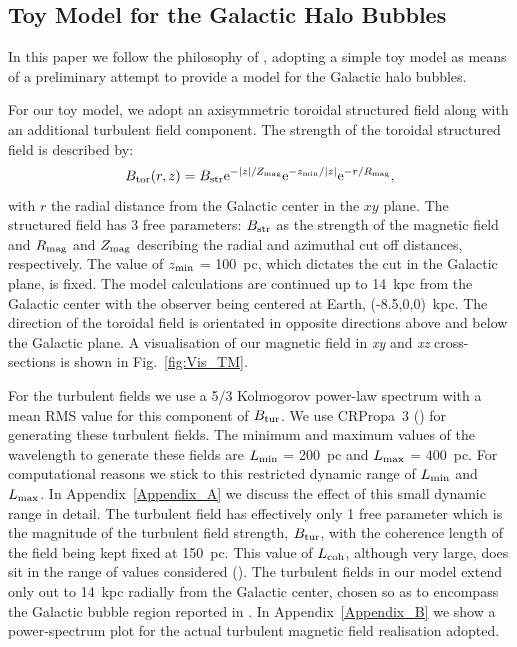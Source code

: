 \documentclass[usenatbib]{mnras}
\begin{document}
\subsection{Toy Model for the Galactic Halo Bubbles}
\label{GMF}
In this paper we follow the philosophy of \cite{West_Helicity}, adopting a simple toy model as means of a preliminary attempt to provide a model for the Galactic halo bubbles. 

For our toy model, we adopt an axisymmetric toroidal structured field along with an additional turbulent field component. The strength of the toroidal structured field is described by:
\begin{equation}\label{TM_equation}
B_{\rm{tor}}(r,z) = B_{\rm{str}} {\rm{e}}^{-|z|/Z_{\rm{mag}}} {\rm{e}}^{-z_{\rm{min}}/|z|} {\rm{e}}^{-r/R_{\rm{mag}}},
\end{equation}
with $r$ the radial distance from the Galactic center in the $xy$ plane.
The structured field has 3 free parameters: $B_{\rm str}$ as the strength of the magnetic field and $R_{\rm {mag}}$ and $Z_{\rm {mag}}$ describing the radial and azimuthal cut off distances, respectively. The value of $z_{\rm min}$ = 100~pc, which dictates the cut in the Galactic plane, is fixed. The model calculations are continued up to 14~kpc from the Galactic center with the observer being centered at Earth, (-8.5,0,0)~kpc. The direction of the toroidal field is orientated in opposite directions above and below the Galactic plane. A visualisation of our magnetic field in \textit{xy} and \textit{xz} cross-sections is shown in Fig.~\ref{fig:Vis_TM}. 

For the turbulent fields we use a 5/3 Kolmogorov power-law spectrum with a mean RMS value for this component of $B_{\rm{tur}}$.
We use CRPropa~3 (\cite{CRPropa3_2016}) for generating these turbulent fields. 
The minimum and maximum values of the wavelength to generate these fields are  $L_{\rm min}$ = 200~pc and $L_{\rm max}$ = 400~pc. For computational reasons we stick to this restricted dynamic range of $L_{\rm min}$ and $L_{\rm max}$. In Appendix~\ref{Appendix_A} we discuss the effect of this small dynamic range in detail. The turbulent field has effectively only 1 free parameter which is the magnitude of the turbulent field strength, $ B_{\rm tur}$, with the coherence length of the field being kept fixed at 150~pc. This value of $L_{\rm coh}$, although very large, does sit in the range of values considered (\cite{Ohno_1993, Chepurnov_2010, Haverkorn_2013, Giacinti_2018}). The turbulent fields in our model extend only out to 14~kpc radially from the Galactic center, chosen so as to encompass the Galactic bubble region reported in \citep{eROSITA}.
In Appendix~\ref{Appendix_B} we show a power-spectrum plot for the actual turbulent magnetic field realisation adopted. 
\end{document}
